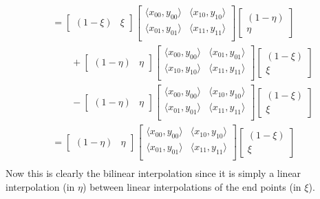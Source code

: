 \documentclass[11pt]{article}
\begin{document}
\begin{problems}
\begin{align*}
&= 
\begin{bmatrix}
    (1-\xi)&\xi
\end{bmatrix}
\begin{bmatrix}
    \langle x_{00}, y_{00}\rangle & \langle x_{10}, y_{10} \rangle\\
    \langle x_{01}, y_{01}\rangle & \langle x_{11}, y_{11} \rangle\\
\end{bmatrix}
\begin{bmatrix}
    (1-\eta)\\\eta
\end{bmatrix}\\
& \qquad +
\begin{bmatrix}
    (1-\eta)&\eta
\end{bmatrix}
\begin{bmatrix}
    \langle x_{00}, y_{00}\rangle & \langle x_{01}, y_{01} \rangle\\
    \langle x_{10}, y_{10}\rangle & \langle x_{11}, y_{11} \rangle\\
\end{bmatrix}
\begin{bmatrix}
    (1-\xi)\\\xi
\end{bmatrix}\\
& \qquad -\begin{bmatrix}
    (1-\eta)&\eta
\end{bmatrix}
\begin{bmatrix}
    \langle x_{00}, y_{00}\rangle & \langle x_{10}, y_{10} \rangle\\
    \langle x_{01}, y_{01}\rangle & \langle x_{11}, y_{11} \rangle\\
\end{bmatrix}
\begin{bmatrix}
    (1-\xi)\\\xi
\end{bmatrix}\\
&= \begin{bmatrix}
    (1-\eta)&\eta
\end{bmatrix}
\begin{bmatrix}
    \langle x_{00}, y_{00}\rangle & \langle x_{10}, y_{10} \rangle\\
    \langle x_{01}, y_{01}\rangle & \langle x_{11}, y_{11} \rangle\\
\end{bmatrix}
\begin{bmatrix}
    (1-\xi)\\\xi
\end{bmatrix}\\
\end{align*}
Now this is clearly the bilinear interpolation since it is simply a linear interpolation 
(in $\eta$) between linear interpolations of the end points (in $\xi$).


\end{problems}
\end{document}
